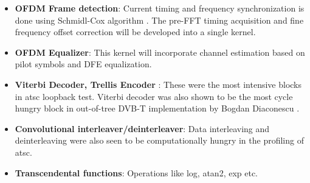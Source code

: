 \documentclass[a4paper,12pt,oneside]{article}
\begin{document}
\begin{itemize}
\item \textbf{OFDM Frame detection}: Current timing and frequency synchronization is done using Schmidl-Cox algorithm \cite{schmidl-cox}. The pre-FFT timing acquisition and fine frequency offset correction will be developed into a single kernel.
\item \textbf{OFDM Equalizer}: This kernel will incorporate channel estimation based on pilot symbols and DFE equalization.
\item \textbf{Viterbi Decoder, Trellis Encoder} : These were the most intensive blocks in atsc loopback test. Viterbi decoder was also shown to be the most cycle hungry block in out-of-tree DVB-T implementation by Bogdan Diaconescu \cite{dvbt}. 
\item \textbf{Convolutional interleaver/deinterleaver}: Data interleaving and deinterleaving were also seen to be computationally hungry in the profiling of atsc. 
\item \textbf{Transcendental functions}: Operations like log, atan2, exp etc.
\end{itemize}
\end{document}
